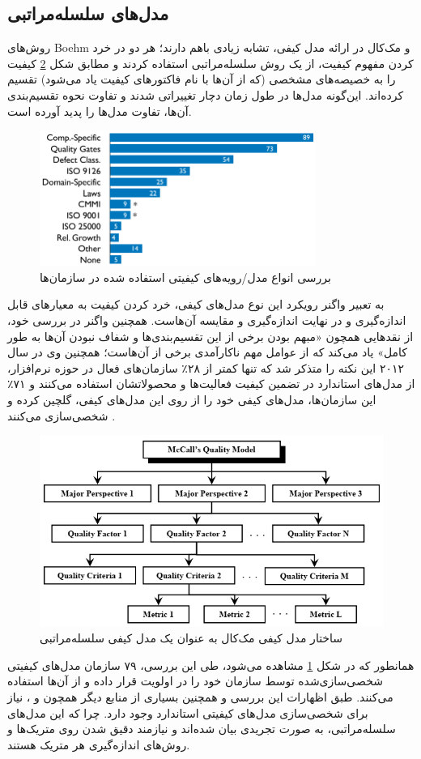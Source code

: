 \subsection{مدل‌های سلسله‌مراتبی}
روش‌های Boehm
\cite{boehm_quantitative_1976}
و مک‌کال
\cite{mccall_factors_1977}
در ارائه مدل کیفی، تشابه زیادی باهم دارند؛ هر دو در خرد کردن مفهوم کیفیت، از یک روش سلسله‌مراتبی استفاده کردند و مطابق شکل
\ref{fig:heir}
کیفیت را به خصیصه‌های مشخصی (که از آن‌ها با نام فاکتورهای کیفیت یاد می‌شود) تقسیم کرده‌اند. این‌گونه مدل‌ها در طول زمان دچار تغییراتی شدند و تفاوت نحوه تقسیم‌بندی آن‌ها، تفاوت مدل‌ها را پدید آورده است.
\begin{figure}[H]
	\centering\includegraphics[width=9cm]{Resources/wagner.PNG}
	\caption{بررسی انواع مدل/رویه‌های کیفیتی استفاده شده در سازمان‌ها
		\cite{wagner_software_2012}
	}
	\label{fig:wagner}
\end{figure}
به تعبیر واگنر
\cite{wagner_software_2013}
رویکرد این نوع مدل‌های کیفی، خرد کردن کیفیت به معیارهای قابل اندازه‌گیری و در نهایت اندازه‌گیری و مقایسه آن‌هاست. همچنین واگنر در بررسی خود، از نقدهایی همچون «مبهم بودن برخی از این تقسیم‌بندی‌ها و شفاف نبودن آن‌ها به طور کامل» یاد می‌کند که از عوامل مهم ناکارآمدی برخی از آن‌هاست؛ همچنین وی در سال ۲۰۱۲ این نکته را متذکر شد که تنها کمتر از ۲۸٪ سازمان‌های فعال در حوزه نرم‌افزار، از مدل‌های استاندارد در تضمین کیفیت فعالیت‌ها و محصولاتشان استفاده می‌کنند و ۷۱٪ این سازمان‌ها، مدل‌های کیفی خود را از روی این مدل‌های کیفی، گلچین کرده و شخصی‌سازی می‌کنند
\cite{wagner_software_2012}.
\begin{figure}[H]
	\centering\includegraphics[width=11	cm]{Resources/heir.PNG}
	\caption{ساختار مدل کیفی مک‌کال به عنوان یک مدل کیفی سلسله‌مراتبی
		\cite{al-qutaish_quality_2010}
	}
	\label{fig:heir}
\end{figure}
همانطور که در شکل
\ref{fig:wagner}
مشاهده می‌شود، طی این بررسی، ۷۹ سازمان مدل‌های کیفیتی شخصی‌سازی‌شده توسط سازمان خود را در اولویت قرار داده و از آن‌ها استفاده می‌کنند. طبق اظهارات این بررسی و همچنین بسیاری از منابع دیگر همچون
\cite{pressman_software_2015} و
\cite{sommerville_software_2016}،
نیاز برای شخصی‌سازی مدل‌های کیفیتی استاندارد وجود دارد. چرا که این مدل‌های سلسله‌مراتبی، به صورت تجریدی بیان شده‌اند و نیازمند دقیق شدن روی متریک‌ها و روش‌های اندازه‌گیری هر متریک هستند.
